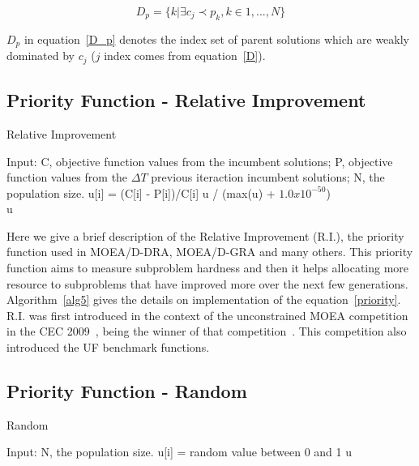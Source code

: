 \begin{equation}
\label{D_p}
D_p = \{k| \exists c_j \prec p_k, k \in {1,..., N}\}
\end{equation}

$D_p$ in equation~\ref{D_p} denotes the index set of parent solutions which are weakly dominated by $c_j$ ($j$ index comes from equation~\ref{D}).



\subsection{Priority Function - Relative Improvement}  

\begin{algorithm}[t]
	\caption{Relative Improvement}\label{alg5}
	\begin{algorithmic}[1]
		
		\State Input:  C, objective function values from the incumbent solutions; P, objective function values from the $\Delta T$ previous iteraction incumbent solutions; N, the population size.
		\State u[i] = (C[i] - P[i])/C[i]
		\EndFor
		u / (max(u) + $1.0 x 10^{-50}$)\\
		\Return u
	\end{algorithmic}
\end{algorithm}

Here we give a brief description of the Relative Improvement (R.I.), the priority function used in MOEA/D-DRA, MOEA/D-GRA and many others. This priority function aims to measure subproblem hardness and then it helps allocating more resource to subproblems that have  improved more over the next few generations. Algorithm~\ref{alg5} gives the details on implementation of the equation~\ref{priority}. R.I. was first introduced in the context of the unconstrained MOEA competition in the CEC 2009~\cite{zhang2009performance}, being the winner of that competition~\cite{zhang2008multiobjective}. This competition also introduced the UF benchmark functions.

\subsection{Priority Function - Random}

\begin{algorithm}[t]
	\caption{Random}\label{alg4}
	\begin{algorithmic}[1]
		
		\State Input:  N, the population size.
		\For {i=1 to N}
		\State u[i] = random value between 0 and 1
		\EndFor
		\Return u
	\end{algorithmic}
\end{algorithm}

